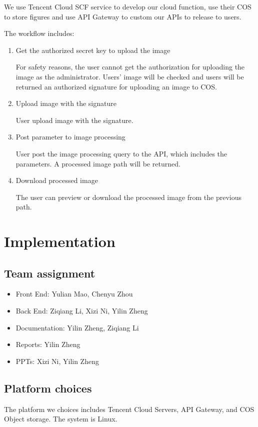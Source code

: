 \documentclass[a4paper,12pt]{article}
\begin{document}
We use Tencent Cloud SCF service to develop our cloud function, use their COS to store figures and use API Gateway to custom our APIs to release to users. 

The workflow includes:

\begin{enumerate}
	\item Get the authorized secret key to upload the image

	For safety reasons, the user cannot get the authorization for uploading the image as the administrator. Users’ image will be checked and users will be returned an authorized signature for uploading an image to COS.
	\item Upload image with the signature
	
	User upload image with the signature.

	\item Post parameter to image processing
	
	User post the image processing query to the API, which includes the parameters. A processed image path will be returned.
	
	\item Download processed image
	
	The user can preview or download the processed image from the previous path.

\end{enumerate}

\section{Implementation}

\subsection{Team assignment}

\begin{itemize}
	\item Front End: Yulian Mao, Chenyu Zhou
	\item Back End: Ziqiang Li, Xizi Ni, Yilin Zheng
	\item Documentation: Yilin Zheng, Ziqiang Li
	\item Reports: Yilin Zheng
	\item PPTs: Xizi Ni, Yilin Zheng
\end{itemize}

\subsection{Platform choices}
	The platform we choices includes Tencent Cloud Servers, API Gateway, and COS Object storage. The system is Linux.
\end{document}
